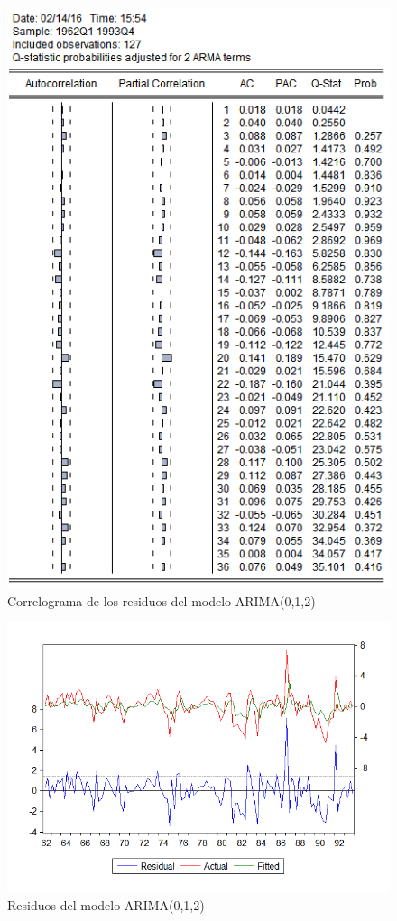 \documentclass[12pt,a4paper,twoside,openright,titlepage,final]{article}
\begin{document}
\begin{figure}[tbph!]
	\centering
	\includegraphics[width=0.7\linewidth]{imagenes/empleo/modelo2-residuos-correlograma.png}
	\caption{Correlograma de los residuos del modelo ARIMA(0,1,2)}
	\label{fig:modelo2-residuos-correlograma}
\end{figure}

\begin{figure}[tbph!]
	\centering
	\includegraphics[width=0.7\linewidth]{imagenes/empleo/modelo2-residuos.png}
	\caption{Residuos del modelo ARIMA(0,1,2)}
	\label{fig:modelo2-residuos}
\end{figure}
\end{document}
